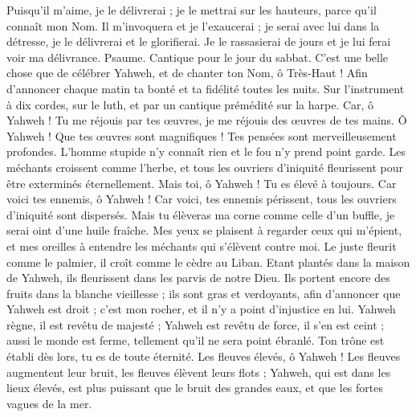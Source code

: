 \begin{multicols}{2}
Puisqu'il m'aime, je le délivrerai ; je le mettrai sur les hauteurs, parce qu'il connaît mon Nom.
Il m'invoquera et je l'exaucerai ; je serai avec lui dans la détresse, je le délivrerai et le glorifierai.
Je le rassasierai de jours et je lui ferai voir ma délivrance.
\VerseOne{}Psaume. Cantique pour le jour du sabbat.
C'est une belle chose que de célébrer Yahweh, et de chanter ton Nom, ô Très-Haut !
Afin d'annoncer chaque matin ta bonté et ta fidélité toutes les nuits.
Sur l'instrument à dix cordes, sur le luth, et par un cantique prémédité sur la harpe.
Car, ô Yahweh ! Tu me réjouis par tes œuvres, je me réjouis des œuvres de tes mains.
Ô Yahweh ! Que tes œuvres sont magnifiques ! Tes pensées sont merveilleusement profondes.
L'homme stupide n'y connaît rien et le fou n'y prend point garde.
Les méchants croissent comme l'herbe, et tous les ouvriers d'iniquité fleurissent pour être exterminés éternellement.
Mais toi, ô Yahweh ! Tu es élevé à toujours.
Car voici tes ennemis, ô Yahweh ! Car voici, tes ennemis périssent, tous les ouvriers d'iniquité sont dispersés.
Mais tu élèveras ma corne comme celle d'un buffle, je serai oint d'une huile fraîche.
Mes yeux se plaisent à regarder ceux qui m'épient, et mes oreilles à entendre les méchants qui s'élèvent contre moi.
Le juste fleurit comme le palmier, il croît comme le cèdre au Liban.
Etant plantés dans la maison de Yahweh, ils fleurissent dans les parvis de notre Dieu.
Ils portent encore des fruits dans la blanche vieillesse ; ils sont gras et verdoyants,
afin d'annoncer que Yahweh est droit ; c'est mon rocher, et il n'y a point d'injustice en lui.
\VerseOne{}Yahweh règne, il est revêtu de majesté ; Yahweh est revêtu de force, il s'en est ceint ; aussi le monde est ferme, tellement qu'il ne sera point ébranlé.
Ton trône est établi dès lors, tu es de toute éternité.
Les fleuves élevés, ô Yahweh ! Les fleuves augmentent leur bruit, les fleuves élèvent leurs flots ;
Yahweh, qui est dans les lieux élevés, est plus puissant que le bruit des grandes eaux, et que les fortes vagues de la mer.

\end{multicols}
